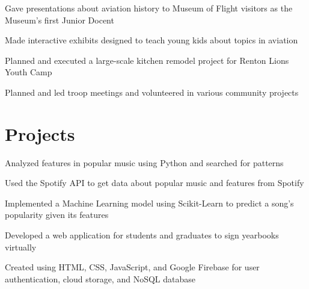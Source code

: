 \documentclass[]{deedy-resume}
\begin{document}
\begin{minipage}[t]{0.66\textwidth}
\begin{tightemize}
\item Gave presentations about aviation history to Museum of Flight visitors as the Museum's first Junior Docent
\item Made interactive exhibits designed to teach young kids about topics in aviation
\end{tightemize}
\sectionsep

\begin{tightemize}
\item Planned and executed a large-scale kitchen remodel project for Renton Lions Youth Camp
\item Planned and led troop meetings and volunteered in various community projects
\end{tightemize}
\sectionsep


\section{Projects}
\begin{tightemize}
\item Analyzed features in popular music using Python and searched for patterns
\item Used the Spotify API to get data about popular music and features from Spotify
\item Implemented a Machine Learning model using Scikit-Learn to predict a song's popularity given its features
\end{tightemize}
\sectionsep

\begin{tightemize}
\item Developed a web application for students and graduates to sign yearbooks virtually
\item Created using HTML, CSS, JavaScript, and Google Firebase for user authentication, cloud storage, and NoSQL database
\end{tightemize}
\sectionsep


\end{minipage}
\end{document}

